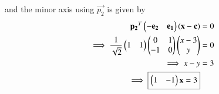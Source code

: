 \documentclass[journal,12pt,twocolumn]{IEEEtran}
\begin{document}
\begin{enumerate}
    and the minor axis using $\vec{p_2}$ is given by
    \begin{align}
        \mathbf{p_2}^T\begin{pmatrix}-\mathbf{e_2} & \mathbf{e_1}\end{pmatrix}\left(\mathbf{x}-\mathbf{c}\right) &= 0 \\
        \implies \frac{1}{\sqrt{2}}\begin{pmatrix}1 & 1\end{pmatrix}\begin{pmatrix}0 & 1 \\ -1 & 0\end{pmatrix}\begin{pmatrix}x-3 \\ y\end{pmatrix} &= 0 \\
        \implies x-y &= 3 \\
        \implies \boxed{\begin{pmatrix}1 & -1\end{pmatrix}\mathbf{x} =3}
    \end{align}
    
\end{enumerate}
\end{document}
